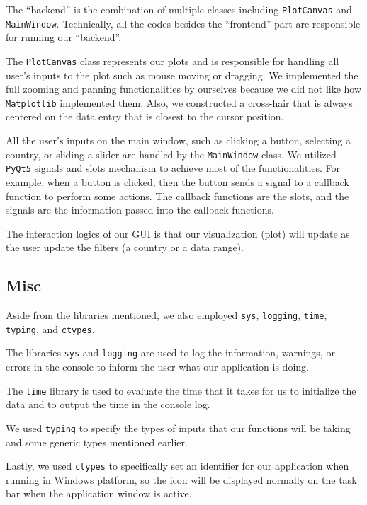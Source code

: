 \documentclass[fontsize=11pt]{article}
\begin{document}
    The ``backend'' is the combination of multiple classes including \verb|PlotCanvas| and \verb|MainWindow|. Technically, all the codes besides the ``frontend'' part are responsible for running our ``backend''.

    The \verb|PlotCanvas| class represents our plots and is responsible for handling all user's inputs to the plot such as mouse moving or dragging. We implemented the full zooming and panning functionalities by ourselves because we did not like how \verb|Matplotlib| implemented them. Also, we constructed a cross-hair that is always centered on the data entry that is closest to the cursor position.

    All the user's inputs on the main window, such as clicking a button, selecting a country, or sliding a slider are handled by the \verb|MainWindow| class. We utilized \verb|PyQt5| signals and slots mechanism to achieve most of the functionalities. For example, when a button is clicked, then the button sends a signal to a callback function to perform some actions. The callback functions are the slots, and the signals are the information passed into the callback functions.

    The interaction logics of our GUI is that our visualization (plot) will update as the user update the filters (a country or a data range).

    \subsection{Misc}

    Aside from the libraries mentioned, we also employed \verb|sys|, \verb|logging|, \verb|time|, \verb|typing|, and \verb|ctypes|.

    The libraries \verb|sys| and \verb|logging| are used to log the information, warnings, or errors in the console to inform the user what our application is doing. 

    The \verb|time| library is used to evaluate the time that it takes for us to initialize the data and to output the time in the console log.

    We used \verb|typing| to specify the types of inputs that our functions will be taking and some generic types mentioned earlier.

    Lastly, we used \verb|ctypes| to specifically set an identifier for our application when running in Windows platform, so the icon will be displayed normally on the task bar when the application window is active.
\end{document}
